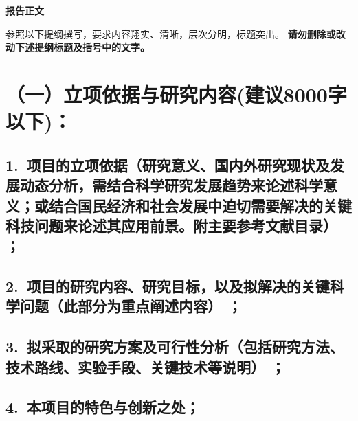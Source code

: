 \documentclass[12pt,UTF8,AutoFakeBold=2.5,a4paper]{ctexart} %
\begin{document}
\begin{center}
{\sanhao \kaishu \bfseries \hspace{2em} 报告正文}
\end{center}

{\sihao \kaishu 参照以下提纲撰写，要求内容翔实、清晰，层次分明，标题突出。{\color{MsBlue} \bfseries 请勿删除或改动下述提纲标题及括号中的文字。}}
\vskip -5mm

\section{{\bfseries（一）立项依据与研究内容}(建议8000字以下)：} %

\subsection{\hspace{1.45em} 1.~{\bfseries 项目的立项依据}（研究意义、国内外研究现状及发展动态分析，需结合科学研究发展趋势来论述科学意义；或结合国民经济和社会发展中迫切需要解决的关键科技问题来论述其应用前景。附主要参考文献目录）\hspace{-14pt} ；}






\subsection{\hspace{1.45em} 2.~{\bfseries 项目的研究内容、研究目标，以及拟解决的关键科学问题}（此部分为重点阐述内容）\hspace{-14pt} {\bfseries ；}}



\subsection{\hspace{1.45em}  3.~{\bfseries 拟采取的研究方案及可行性分析}（包括研究方法、技术路线、实验手段、关键技术等说明）\hspace{-14pt} ；}



\subsection{\hspace{1.45em}  4.~{\bfseries 本项目的特色与创新之处；}}
\end{document}
